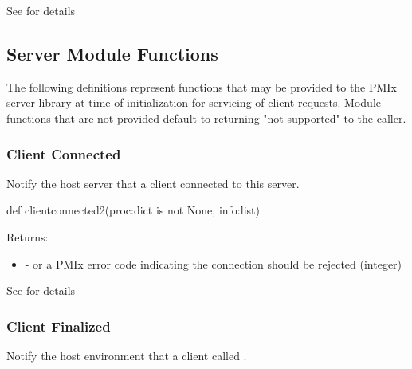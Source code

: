 See  for details


\subsection{Server Module Functions}

The following definitions represent functions that may be provided to the \ac{PMIx} server library at time of initialization for servicing of client requests. Module functions that are not provided default to returning "not supported" to the caller.


\subsubsection{Client Connected}

\summary

Notify the host server that a client connected to this server.

\format

\pyspecificstart
\begin{codepar}
def clientconnected2(proc:dict is not None, info:list)
\end{codepar}
\pyspecificend

\begin{arglist}
\end{arglist}

Returns:
\begin{itemize}
    \item {} -  or a \ac{PMIx} error code indicating the connection should be rejected (integer)
\end{itemize}

See  for details


\subsubsection{Client Finalized}

\summary

Notify the host environment that a client called .


